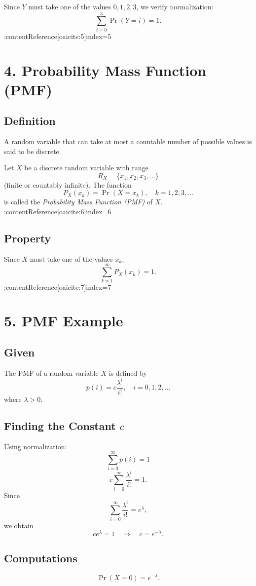 \documentclass[11pt]{article}
\begin{document}
Since $Y$ must take one of the values $0,1,2,3$, we verify normalization:
\[
\sum_{i=0}^{3} \Pr(Y=i) = 1.
\] 
:contentReference[oaicite:5]{index=5}

\section*{4. Probability Mass Function (PMF)}

\subsection*{Definition}
A random variable that can take at most a countable number of possible values is said to be discrete.

Let $X$ be a discrete random variable with range
\[
R_X = \{x_1, x_2, x_3, \dots\}
\]
(finite or countably infinite).  
The function
\[
P_X(x_k) = \Pr(X = x_k), \quad k = 1,2,3,\dots
\]
is called the \emph{Probability Mass Function (PMF)} of $X$. :contentReference[oaicite:6]{index=6}

\subsection*{Property}
Since $X$ must take one of the values $x_k$,
\[
\sum_{k=1}^{\infty} P_X(x_k) = 1.
\] 
:contentReference[oaicite:7]{index=7}

\section*{5. PMF Example}

\subsection*{Given}
The PMF of a random variable $X$ is defined by
\[
p(i) = c \frac{\lambda^i}{i!}, \quad i=0,1,2,\dots
\]
where $\lambda > 0$.

\subsection*{Finding the Constant $c$}
Using normalization:
\[
\sum_{i=0}^{\infty} p(i) = 1
\]
\[
c \sum_{i=0}^{\infty} \frac{\lambda^i}{i!} = 1.
\]
Since
\[
\sum_{i=0}^{\infty} \frac{\lambda^i}{i!} = e^{\lambda},
\]
we obtain
\[
c e^{\lambda} = 1 \quad \Rightarrow \quad c = e^{-\lambda}.
\]

\subsection*{Computations}
\[
\Pr(X=0) = e^{-\lambda}.
\]
\end{document}
